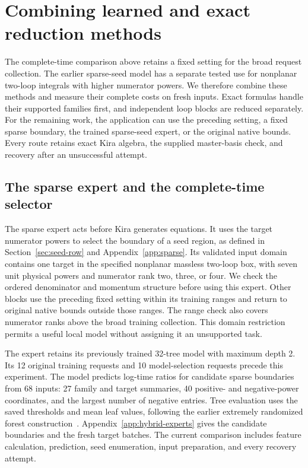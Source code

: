 \section{Combining learned and exact reduction methods}
\label{sec:hybrid-experts}
The complete-time comparison above retains a fixed setting for the broad request collection. The earlier sparse-seed model has a separate tested use for nonplanar two-loop integrals with higher numerator powers. We therefore combine these methods and measure their complete costs on fresh inputs. Exact formulas handle their supported families first, and independent loop blocks are reduced separately. For the remaining work, the application can use the preceding setting, a fixed sparse boundary, the trained sparse-seed expert, or the original native bounds. Every route retains exact Kira algebra, the supplied master-basis check, and recovery after an unsuccessful attempt.

\subsection{The sparse expert and the complete-time selector}
The sparse expert acts before Kira generates equations. It uses the target numerator powers to select the boundary of a seed region, as defined in Section~\ref{sec:seed-row} and Appendix~\ref{app:sparse}. Its validated input domain contains one target in the specified nonplanar massless two-loop box, with seven unit physical powers and numerator rank two, three, or four. We check the ordered denominator and momentum structure before using this expert. Other blocks use the preceding fixed setting within its training ranges and return to original native bounds outside those ranges. The range check also covers numerator ranks above the broad training collection. This domain restriction permits a useful local model without assigning it an unsupported task.

The expert retains its previously trained 32-tree model with maximum depth 2. Its 12 original training requests and 10 model-selection requests precede this experiment. The model predicts log-time ratios for candidate sparse boundaries from 68 inputs: 27 family and target summaries, 40 positive- and negative-power coordinates, and the largest number of negative entries. Tree evaluation uses the saved thresholds and mean leaf values, following the earlier extremely randomized forest construction~\cite{Geurts2006ExtraTrees}. Appendix~\ref{app:hybrid-experts} gives the candidate boundaries and the fresh target batches. The current comparison includes feature calculation, prediction, seed enumeration, input preparation, and every recovery attempt.

